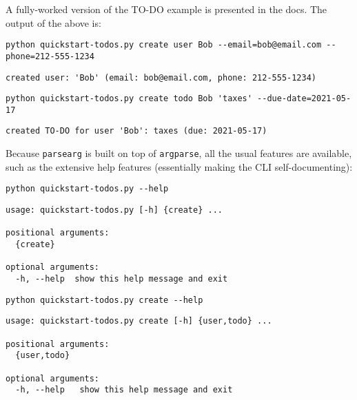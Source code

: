 \documentclass[10pt]{amsart}
\numberwithin{equation}{section}
\begin{document}
A fully-worked version of the TO-DO example is presented in the docs. The output
of the above is:
\begin{verbatim}
python quickstart-todos.py create user Bob --email=bob@email.com --phone=212-555-1234
\end{verbatim}

\begin{verbatim}
created user: 'Bob' (email: bob@email.com, phone: 212-555-1234)
\end{verbatim}


\begin{verbatim}
python quickstart-todos.py create todo Bob 'taxes' --due-date=2021-05-17
\end{verbatim}

\begin{verbatim}
created TO-DO for user 'Bob': taxes (due: 2021-05-17)
\end{verbatim}


Because \texttt{parsearg} is built on top of \texttt{argparse}, all the usual features
are available, such as the extensive help features (essentially
making the CLI self-documenting):
\begin{verbatim}
python quickstart-todos.py --help
\end{verbatim}

\begin{verbatim}
usage: quickstart-todos.py [-h] {create} ...

positional arguments:
  {create}

optional arguments:
  -h, --help  show this help message and exit
\end{verbatim}



\begin{verbatim}
python quickstart-todos.py create --help
\end{verbatim}

\begin{verbatim}
usage: quickstart-todos.py create [-h] {user,todo} ...

positional arguments:
  {user,todo}

optional arguments:
  -h, --help   show this help message and exit
\end{verbatim}
\end{document}
